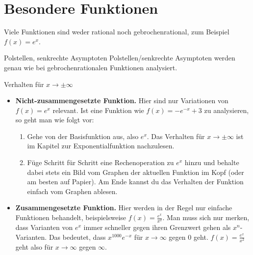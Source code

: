 \clearpage
\section{Besondere Funktionen}

Viele Funktionen sind weder rational noch gebrochenrational, zum Beispiel $f(x)=e^x$.

\begin{bla}{Polstellen, senkrechte Asymptoten}
  Polstellen/senkrechte Asymptoten werden genau wie bei gebrochenrationalen Funktionen analysiert.
\end{bla}

\begin{bla}{Verhalten für $x \rightarrow \pm \infty$}
  \begin{itemize}
    \item \textbf{Nicht-zusammengesetzte Funktion.} Hier sind nur Variationen von $f(x)=e^x$ relevant. Ist eine Funktion wie $f(x)=-e^{-x}+3$ zu analysieren, so geht man wie folgt vor:
    \begin{enumerate}
      \item Gehe von der Basisfunktion aus, also $e^x$. Das Verhalten für $x \rightarrow \pm \infty$ ist im Kapitel zur Exponentialfunktion nachzulesen.
      \item Füge Schritt für Schritt eine Rechenoperation zu $e^x$ hinzu und behalte dabei stets ein Bild vom Graphen der aktuellen Funktion im Kopf (oder am besten auf Papier). Am Ende kannst du das Verhalten der Funktion einfach vom Graphen ablesen.
    \end{enumerate}
    \item \textbf{Zusammengesetzte Funktion.} Hier werden in der Regel nur einfache Funktionen behandelt, beispielsweise $f(x)=\frac{e^x}{x^2}$. Man muss sich nur merken, dass Varianten von $e^x$ immer schneller gegen ihren Grenzwert gehen als $x^n$-Varianten. Das bedeutet, dass $x^{1000}e^{-x}$ für $x \rightarrow \infty$ gegen $0$ geht. $f(x)=\frac{e^x}{x^2}$ geht also für $x \rightarrow \infty$ gegen $\infty$.
  \end{itemize}
\end{bla}

\clearpage

